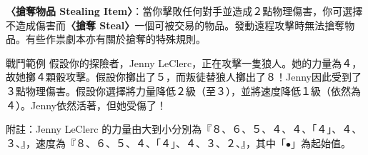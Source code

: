 \textbf{〈搶奪物品 Stealing Item〉}：當你擊敗任何對手並造成２點物理傷害，你可選擇不造成傷害而\textbf{〈搶奪 Steal〉}一個可被交易的物品。發動遠程攻擊時無法搶奪物品。有些作祟劇本亦有關於搶奪的特殊規則。

\begin{RuleBox}{戰鬥範例}
  假設你的探險者，Jenny LeClerc，正在攻擊一隻狼人。她的力量為４，故她擲４顆骰攻擊。假設你擲出了５，而叛徒替狼人擲出了８！Jenny因此受到了３點物理傷害。假設你選擇將力量降低２級（至３），並將速度降低１級（依然為４）。Jenny依然活著，但她受傷了！

  附註：Jenny LeClerc 的力量由大到小分別為『８、６、５、４、４、\textcolor{green!50!black}{「４」}、４、３、\SkullSymbol{}』，速度為『８、６、５、４、\textcolor{green!50!black}{「４」}、４、３、２、\SkullSymbol{}』，其中「$\bullet$」為起始值。
\end{RuleBox}
